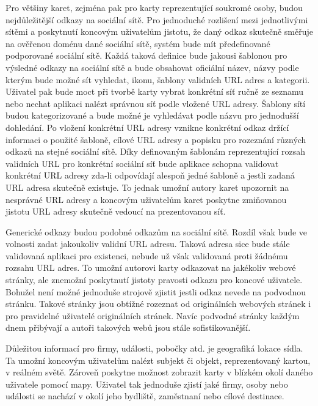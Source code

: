 \begin{itemize}
\begin{itemize}
	Pro většiny karet, zejména pak pro karty reprezentující soukromé osoby, budou nejdůležitější odkazy na sociální sítě.
	Pro jednoduché rozlišení mezi jednotlivými sítěmi a poskytnutí koncovým uživatelům jistotu, že daný odkaz skutečně
	směřuje na ověřenou doménu dané sociální sítě, systém bude mít předefinované podporované sociální sítě.
	Každá taková definice bude jakousi šablonou pro výsledné odkazy na sociální sítě a bude obsahovat oficiální název,
	názvy podle kterým bude možné sít vyhledat, ikonu, šablony validních \ac{URL} adres a kategorii.
	Uživatel pak bude moct při tvorbě karty vybrat konkrétní síť ručně ze seznamu nebo nechat aplikaci nalézt správnou
	síť podle vložené \ac{URL} adresy.
	Šablony sítí budou kategorizované a bude možné je vyhledávat podle názvu pro jednodušší dohledání.
	Po vložení konkrétní \ac{URL} adresy vznikne konkrétní odkaz držící informaci o použité šabloně, cílové \ac{URL} adresy a
	popisku pro rozeznání různých odkazů na stejné sociální sítě.
	Díky definovaným šablonám reprezentující rozsah validních \ac{URL} pro konkrétní sociální síť bude aplikace schopna
	validovat konkrétní \ac{URL} adresy zda-li odpovídají alespoň jedné šabloně a jestli zadaná \ac{URL} adresa skutečně existuje.
	To jednak umožní autory karet upozornit na nesprávné \ac{URL} adresy a koncovým uživatelům karet poskytne zmiňovanou jistotu
	\ac{URL} adresy skutečně vedoucí na prezentovanou síť.

	Generické odkazy budou podobné odkazům na sociální sítě.
	Rozdíl však bude ve volnosti zadat jakoukoliv validní \ac{URL} adresu.
	Taková adresa sice bude stále validovaná aplikaci pro existenci, nebude už však validovaná proti žádnému rozsahu
	\ac{URL} adres.
	To umožní autorovi karty odkazovat na jakékoliv webové stránky, ale znemožní poskytnutí jistoty pravosti odkazu
	pro koncové uživatele.
	Bohužel není možné jednoduše strojově zjistit jestli odkaz nevede na podvodnou stránku.
	Takové stránky jsou obtížné rozeznat od originálních webových stránek i pro pravidelné uživatelé originálních stránek.
	Navíc podvodné stránky každým dnem přibývají a autoři takových webů jsou stále sofistikovanější.

	Důležitou informací pro firmy, události, pobočky atd. je geografiká lokace sídla.
	Ta umožní koncovým uživatelům nalézt subjekt či objekt, reprezentovaný kartou, v reálném světě.
	Zároveň poskytne možnost zobrazit karty v blízkém okolí daného uživatele pomocí mapy.
	Uživatel tak jednoduše zjistí jaké firmy, osoby nebo události se nachází v okolí jeho bydliště, zaměstnaní nebo
	cílové destinace.


\end{itemize}
\end{itemize}
